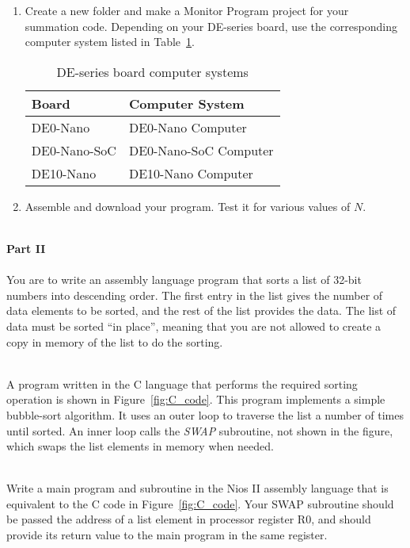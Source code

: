 \documentclass[epsfig,10pt,fullpage]{article}
\begin{document}
\begin{enumerate}
\item
Create a new folder and make a Monitor Program project for your summation code. Depending on your DE-series board, use the corresponding computer system 
listed in Table~\ref{tab:computer_systems}.

\begin{table}[H]
	\begin{center}
	\begin{tabular}{ l | l }
	\bf{Board} & \bf{Computer System} \\
	\hline
	\rule{0pt}{3ex}DE0-Nano & DE0-Nano Computer \\
	DE0-Nano-SoC & DE0-Nano-SoC Computer \\
	DE10-Nano & DE10-Nano Computer \\
	\end{tabular}
	\caption{DE-series board computer systems}
	\label{tab:computer_systems}
	\end{center}
\end{table}

\item
Assemble and download your program.  Test it for various values of $N$.
\end{enumerate}

~\\
\noindent
{\bf Part II}
~\\
~\\
\noindent
You are to write an assembly language program that sorts a list of 32-bit numbers 
into descending order.  The first entry in the list gives the number of data elements to 
be sorted, and the rest of the list provides the data. The list of data must be 
sorted ``in place'', meaning that you are not allowed to create a copy in memory of the 
list to do the sorting.  

~\\
\noindent
A program written in the C language that performs the required sorting operation is shown in
Figure~\ref{fig:C_code}. This program implements a simple bubble-sort algorithm. It uses
an outer loop to traverse the list a number of times until sorted. An inner loop 
calls the {\it SWAP} subroutine, not shown in the figure, which swaps the list elements in
memory when needed.

~\\
\noindent
Write a main program and subroutine in the Nios II assembly language that is equivalent to the C code 
in Figure~\ref{fig:C_code}.
Your SWAP subroutine should be passed the address of a list element in processor register R0, 
and should provide its return value to the main program in the same register. 
\end{document}
